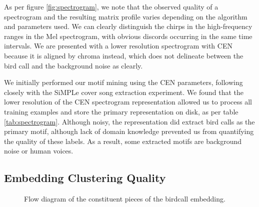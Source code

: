 \documentclass[
]{ceurart}
\begin{document}
As per figure \ref{fig:spectrogram}, we note that the observed quality of a spectrogram and the resulting matrix profile varies depending on the algorithm and parameters used. We can clearly distinguish the chirps in the high-frequency ranges in the Mel spectrogram, with obvious discords occurring in the same time intervals. We are presented with a lower resolution spectrogram with CEN because it is aligned by chroma instead, which does not delineate between the bird call and the background noise as clearly.

We initially performed our motif mining using the CEN parameters, following closely with the SiMPLe cover song extraction experiment. We found that the lower resolution of the CEN spectrogram representation allowed us to process all training examples and store the primary representation on disk, as per table \ref{tab:spectrogram}. Although noisy, the representation did extract bird calls as the primary motif, although lack of domain knowledge prevented us from quantifying the quality of these labels. As a result, some extracted motifs are background noise or human voices.

\subsection{Embedding Clustering Quality}

\begin{figure}[hbt!]
\centering
{}
\caption{Flow diagram of the constituent pieces of the birdcall embedding.}
\end{figure}
\end{document}

